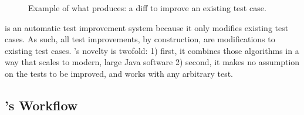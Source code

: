 \begin{figure}[!ht]
	\centering{}
	\caption{Example of what \dspot produces: a diff to improve an existing test case.}
	\label{fig:diff-protostuff}
\end{figure}

\dspot is an automatic test improvement system because it only modifies existing test cases. As such, all test improvements, by construction, are modifications to existing test cases.
\dspot's novelty is twofold: 1) first, it combines those algorithms in a way that scales to modern, large Java software 2) second, it makes no assumption on the tests to be improved, and works with any arbitrary \junit test.


\subsection{\dspot's Workflow}

